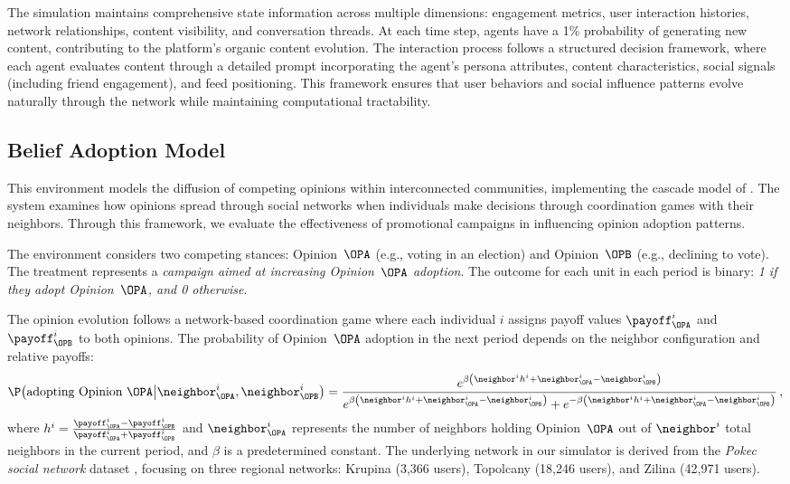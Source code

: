 The simulation maintains comprehensive state information across multiple dimensions: engagement metrics, user interaction histories, network relationships, content visibility, and conversation threads. At each time step, agents have a 1\% probability of generating new content, contributing to the platform's organic content evolution. The interaction process follows a structured decision framework, where each agent evaluates content through a detailed prompt incorporating the agent's persona attributes, content characteristics, social signals (including friend engagement), and feed positioning. This framework ensures that user behaviors and social influence patterns evolve naturally through the network while maintaining computational tractability.


\subsection{Belief Adoption Model}
\label{sec:Belief_Adoption}
%
This environment models the diffusion of competing opinions within interconnected communities, implementing the cascade model of \cite{montanari2010spread}. The system examines how opinions spread through social networks when individuals make decisions through coordination games with their neighbors. Through this framework, we evaluate the effectiveness of promotional campaigns in influencing opinion adoption patterns.

The environment considers two competing stances: Opinion~$\OPA$ (e.g., voting in an election) and Opinion~$\OPB$ (e.g., declining to vote). The treatment represents a \emph{campaign aimed at increasing Opinion~$\OPA$ adoption}. The outcome for each unit in each period is binary: \emph{1 if they adopt Opinion~$\OPA$, and 0 otherwise}.

The opinion evolution follows a network-based coordination game where each individual $i$ assigns payoff values $\payoff^i_\OPA$ and $\payoff^i_\OPB$ to both opinions. The probability of Opinion~$\OPA$ adoption in the next period depends on the neighbor configuration and relative payoffs:
% 
\begin{align*}
    \P\big(\text{adopting Opinion~$\OPA$} \big| \neighbor^i_\OPA,\neighbor^i_\OPB \big) =
    \frac{e^{\beta \left( \neighbor^i h^i + \neighbor^i_\OPA - \neighbor^i_\OPB  \right)}}{e^{\beta \left(\neighbor^i h^i + \neighbor^i_\OPA - \neighbor^i_\OPB  \right)} + e^{-\beta  \left(\neighbor^i h^i + \neighbor^i_\OPA - \neighbor^i_\OPB  \right)}}\,,
\end{align*}
% 
where $h^i = \frac{\payoff^i_\OPA - \payoff^i_\OPB}{\payoff^i_\OPA + \payoff^i_\OPB}$ and $\neighbor^i_\OPA$ represents the number of neighbors holding Opinion~$\OPA$ out of $\neighbor^i$ total neighbors in the current period, and $\beta$ is a predetermined constant. The underlying network in our simulator is derived from the \emph{Pokec social network} dataset \citep{takac2012data,snapnets}, focusing on three regional networks: Krupina (3,366 users), Topolcany (18,246 users), and Zilina (42,971 users).

